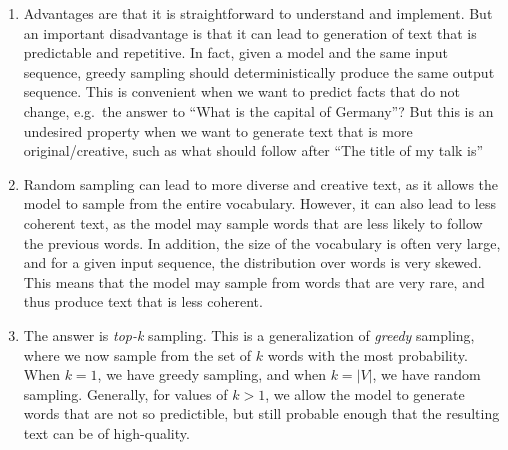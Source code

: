 \documentclass[11pt,a4paper]{article}
\begin{document}
\begin{enumerate}[label=(\alph*)]
    \item Advantages are that it is straightforward to understand and implement.
          But an important disadvantage is that it can lead to generation of
          text that is predictable and repetitive.
          In fact, given a model and the same input sequence, greedy sampling
          should deterministically produce the same output sequence.
          This is convenient when we want to predict facts that do not change,
          e.g.\ the answer to ``What is the capital of Germany''?
          But this is an undesired property when we want to generate text that
          is more original/creative, such as what should follow after ``The
          title of my talk is''
    \item Random sampling can lead to more diverse and creative text, as it
          allows the model to sample from the entire vocabulary.
          However, it can also lead to less coherent text, as the model may
          sample words that are less likely to follow the previous words.
          In addition, the size of the vocabulary is often very large, and for
          a given input sequence, the distribution over words is very skewed.
          This means that the model may sample from words that are very rare,
          and thus produce text that is less coherent.
    \item The answer is \emph{top-k} sampling. This is a generalization of
          \emph{greedy} sampling, where we now sample from the set of $k$ words
          with the most probability.
          When $k=1$, we have greedy sampling, and when $k=|V|$, we have random
          sampling.
          Generally, for values of $k > 1$, we allow the model to generate words
          that are not so predictible, but still probable enough that the
          resulting text can be of high-quality.


\end{enumerate}
\end{document}
